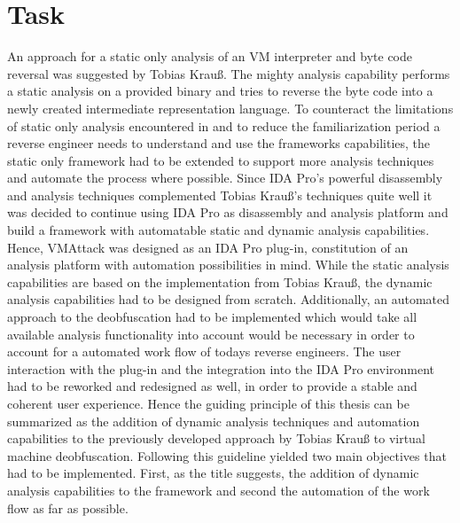 \documentclass[10pt,twoside,a4paper,bibliography=totoc]{scrbook}
\newcommand{\echoOther}[1]{Tobias Krau{\ss}}
\begin{document}
\section{Task}
\label{sec1:task}
An approach for a static only analysis of an VM interpreter and byte code reversal was suggested by \echoOther{}. The mighty analysis capability performs a static analysis on a provided binary and tries to reverse the byte code into a newly created intermediate representation language. To counteract the limitations of static only analysis encountered in \cite{Krau:Thesis2016} and to reduce the familiarization period a reverse engineer needs to understand and use the frameworks capabilities, the static only framework had to be extended to support more analysis techniques and automate the process where possible. Since IDA Pro's powerful disassembly and analysis techniques complemented \echoOther{}'s techniques quite well it was decided to continue using IDA Pro as disassembly and analysis platform and build a framework with automatable static and dynamic analysis capabilities.\\
Hence, VMAttack was designed as an IDA Pro plug-in, constitution of an analysis platform with automation possibilities in mind. While the static analysis capabilities are based on the implementation from \echoOther{}\cite{Krau:Thesis2016}, the dynamic analysis capabilities had to be designed from scratch. Additionally, an automated approach to the deobfuscation had to be implemented which would take all available analysis functionality into account would be necessary in order to account for a automated work flow of todays reverse engineers. The user interaction with the plug-in and the integration into the IDA Pro environment had to be reworked and redesigned as well, in order to provide a stable and coherent user experience.
Hence the guiding principle of this thesis can be summarized as the addition of dynamic analysis techniques and automation capabilities to the previously developed approach by \echoOther{} to virtual machine deobfuscation.
Following this guideline yielded two main objectives that had to be implemented. First, as the title suggests, the addition of dynamic analysis capabilities to the framework and second the automation of the work flow as far as possible. 
\end{document}
